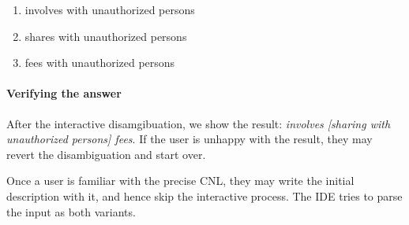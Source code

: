 \documentclass[11pt]{article}
\begin{document}
{\begin{enumerate}[label=\alph*)]
    \item involves with unauthorized persons 
    \item shares with unauthorized persons
    \item fees with unauthorized persons
\end{enumerate}}


 


\paragraph{Verifying the answer}
After the interactive disamgibuation, 
we show the result: \textit{involves [sharing with unauthorized persons] fees}. If the user is unhappy with the result, they may revert the disambiguation and start over.

Once a user is familiar with the precise CNL, they may write the initial description with it, and hence skip the interactive process. The IDE tries to parse the input as both variants. 




\end{document}
